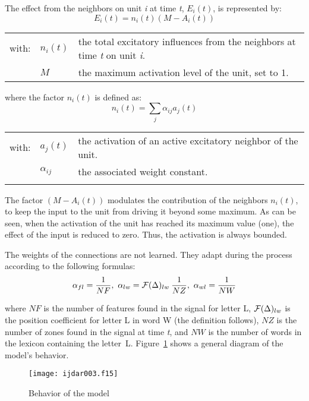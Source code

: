 \documentclass[ijdar]{svjour}
\begin{document}
\medskip
\noindent The effect from the neighbors on unit {\em{i}} at time
{\em{t}}, $E_{i}(t)$, is represented by:
%
\begin{equation}
E_{i}(t) = n_{i}(t)(M - A_{i}(t)) \label{eq:contribution}
\end{equation}
%
\begin{tabular}{@{}p{9mm}@{}p{1.85cm}@{}p{5.8cm}@{}}
with:           &$n_{i}(t)$             &the total excitatory influences from the
                                        neighbors at time {\em{t}} on unit {\em{i}}.\\
                &$M$                    &the maximum activation level of
                                        the unit, set to 1.
\end{tabular}

\medskip
\noindent where the factor $n_{i}(t)$ is defined as:
%
\begin{equation}
n_{i}(t) = \sum_{j}\alpha_{ij}a_{j}(t) \label{eq:excitation}
\end{equation}
%
\begin{tabular}{@{}p{9mm}@{}p{1.85cm}@{}p{5.8cm}@{}}
with:           &$a_{j}(t)$             &the activation of an active
                                        \mbox{excitatory} neighbor of the unit.\\
                &$\alpha_{ij}$          &the associated weight constant.\\
&&
\end{tabular}

\noindent The factor $(M - A_{i}(t))$ modulates the contribution of the neighbors $n_{i}(t)$, to keep the input to the unit from driving it beyond some maximum.
As can be seen, when the activation of the unit has reached its maximum value (one), the effect of the input is reduced to zero.
Thus, the activation is always bounded.

The weights of the connections are not learned.
They adapt during the process according to the following formulas:
%
\begin{displaymath}%
\alpha_{fl} = \frac{1}{NF},~
\alpha_{lw} = {\cal F}(\Delta)_{lw}\:\frac{1}{NZ},~
\alpha_{wl} = \frac{1}{NW}
\end{displaymath}%

\noindent where $NF$ is the number of features found in the signal for letter L, ${\cal F}(\Delta)_{lw}$ is the position coefficient for letter L in word W (the definition follows),  $NZ$ is the number of zones found in the signal at time {\em{t}}, and $NW$ is the number of words in the lexicon containing the letter~L.
Figure~\ref{FIGFLUX} shows a general diagram of the model's behavior.
%
\begin{figure}%
\texttt{[image: ijdar003.f15]}%
\caption{Behavior of the model}
\label{FIGFLUX}
\end{figure}
\end{document}
